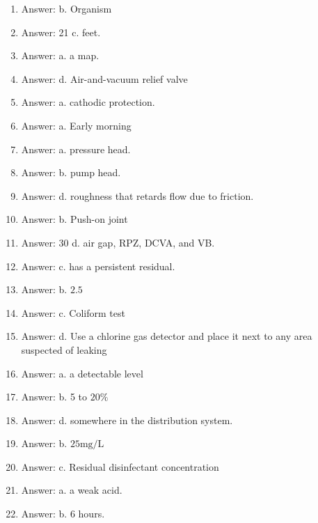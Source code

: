 \documentclass[10pt]{article}
\begin{document}
\begin{enumerate}
  \item Answer: b.  Organism
  
  \item Answer: 21 c. feet.

  \item Answer: a. a map.

  \item Answer: d. Air-and-vacuum relief valve

  \item Answer: a. cathodic protection.

  \item Answer: a. Early morning
  
  \item Answer: a. pressure head.

  \item Answer: b. pump head.

  \item Answer: d. roughness that retards flow due to friction.

  \item Answer: b. Push-on joint
  
  \item Answer: 30 d. air gap, RPZ, DCVA, and VB.

  \item Answer: c. has a persistent residual.

  \item Answer: b. $2.5$

  \item Answer: c. Coliform test

  \item Answer: d. Use a chlorine gas detector and place it next to any area suspected of leaking

  \item Answer: a. a detectable level

  \item Answer: b. 5 to $20 \%$

  \item Answer: d. somewhere in the distribution system.

  \item Answer: b. $25 \mathrm{mg} / \mathrm{L}$

  \item Answer: c. Residual disinfectant concentration

  \item Answer: a. a weak acid.
 
  \item Answer: b. 6 hours.


\end{enumerate}
\end{document}
